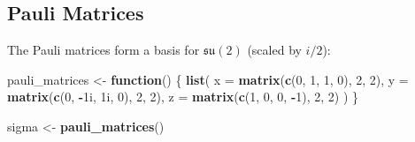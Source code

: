 \documentclass[
]{book}
\newenvironment{Shaded}{\begin{snugshade}}{\end{snugshade}}
\newcommand{\AttributeTok}[1]{\textcolor[rgb]{0.13,0.29,0.53}{#1}}
\newcommand{\ControlFlowTok}[1]{\textcolor[rgb]{0.13,0.29,0.53}{\textbf{#1}}}
\newcommand{\DataTypeTok}[1]{\textcolor[rgb]{0.13,0.29,0.53}{#1}}
\newcommand{\DecValTok}[1]{\textcolor[rgb]{0.00,0.00,0.81}{#1}}
\newcommand{\FunctionTok}[1]{\textcolor[rgb]{0.13,0.29,0.53}{\textbf{#1}}}
\newcommand{\NormalTok}[1]{#1}
\newcommand{\OtherTok}[1]{\textcolor[rgb]{0.56,0.35,0.01}{#1}}
\newcommand{\SpecialCharTok}[1]{\textcolor[rgb]{0.81,0.36,0.00}{\textbf{#1}}}
\theoremstyle{definition}
\theoremstyle{definition}
\theoremstyle{definition}
\theoremstyle{definition}
\theoremstyle{remark}
\begin{document}
\subsection{Pauli Matrices}\label{pauli-matrices}

The Pauli matrices form a basis for \(\mathfrak{su}(2)\) (scaled by \(i/2\)):

\begin{Shaded}
\begin{Highlighting}[]
\NormalTok{pauli\_matrices }\OtherTok{\textless{}{-}} \ControlFlowTok{function}\NormalTok{() \{}
  \FunctionTok{list}\NormalTok{(}
    \AttributeTok{x =} \FunctionTok{matrix}\NormalTok{(}\FunctionTok{c}\NormalTok{(}\DecValTok{0}\NormalTok{, }\DecValTok{1}\NormalTok{, }\DecValTok{1}\NormalTok{, }\DecValTok{0}\NormalTok{), }\DecValTok{2}\NormalTok{, }\DecValTok{2}\NormalTok{),}
    \AttributeTok{y =} \FunctionTok{matrix}\NormalTok{(}\FunctionTok{c}\NormalTok{(}\DecValTok{0}\NormalTok{, }\SpecialCharTok{{-}}\DecValTok{1}\DataTypeTok{i}\NormalTok{, }\DecValTok{1}\DataTypeTok{i}\NormalTok{, }\DecValTok{0}\NormalTok{), }\DecValTok{2}\NormalTok{, }\DecValTok{2}\NormalTok{),}
    \AttributeTok{z =} \FunctionTok{matrix}\NormalTok{(}\FunctionTok{c}\NormalTok{(}\DecValTok{1}\NormalTok{, }\DecValTok{0}\NormalTok{, }\DecValTok{0}\NormalTok{, }\SpecialCharTok{{-}}\DecValTok{1}\NormalTok{), }\DecValTok{2}\NormalTok{, }\DecValTok{2}\NormalTok{)}
\NormalTok{  )}
\NormalTok{\}}

\NormalTok{sigma }\OtherTok{\textless{}{-}} \FunctionTok{pauli\_matrices}\NormalTok{()}


\end{Highlighting}
\end{Shaded}
\end{document}
